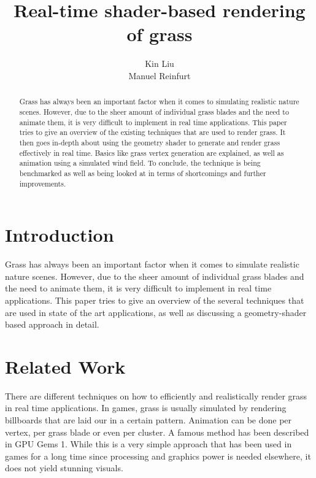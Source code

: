 \documentclass[conference]{acmsiggraph}
\title{Real-time shader-based rendering of grass}
\author {Kin Liu\\Manuel Reinfurt}
\begin{document}

\maketitle

\begin{abstract}

Grass has always been an important factor when it comes to simulating realistic nature scenes. However, due to the sheer amount of individual grass blades and the need to animate them, it is very difficult to implement in real time applications. This paper tries to give an overview of the existing techniques that are used to render grass. It then goes in-depth about using the geometry shader to generate and render grass effectively in real time. Basics like grass vertex generation are explained, as well as animation using a simulated wind field. To conclude, the technique is being benchmarked as well as being looked at in terms of shortcomings and further improvements.

\end{abstract}

\TOGlinkslist


\copyrightspace

\section{Introduction}

Grass has always been an important factor when it comes to simulate realistic nature scenes. However, due to the sheer amount of individual grass blades and the need to animate them, it is very difficult to implement in real time applications. This paper tries to give an overview of the several techniques that are used in state of the art applications, as well as discussing a geometry-shader based approach in detail.\cite{Park:2006:DSI}

\section{Related Work}

There are different techniques on how to efficiently and realistically render grass in real time applications. In games, grass is usually simulated by rendering billboards that are laid our in a certain pattern. Animation can be done per vertex, per grass blade or even per cluster. A famous method has been described in GPU Gems 1. While this is a very simple approach that has been used in games for a long time since processing and graphics power is needed elsewhere, it does not yield stunning visuals.
\end{document}

